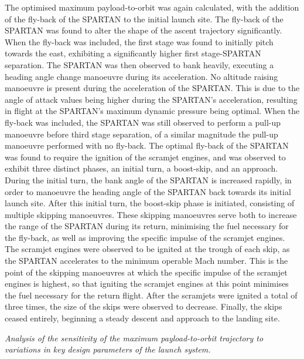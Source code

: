 The optimised maximum payload-to-orbit was again calculated, with the addition of the fly-back of the SPARTAN to the initial launch site. 
	The fly-back of the SPARTAN was found to alter the shape of the ascent trajectory significantly. When the fly-back was included, the first stage was found to initially pitch towards the east, exhibiting a significantly higher first stage-SPARTAN separation. The SPARTAN was then observed to bank heavily, executing a heading angle change manoeuvre during its acceleration. No altitude raising manoeuvre is present during the acceleration of the SPARTAN. This is due to the angle of attack values being higher during the SPARTAN's acceleration, resulting in flight at the SPARTAN's maximum dynamic pressure being optimal. 
When the fly-back was included, the SPARTAN was still observed to perform a pull-up manoeuvre before third stage separation, of a similar magnitude the pull-up manoeuvre performed with no fly-back. 
The optimal fly-back of the SPARTAN was found to require the ignition of the scramjet engines, and was observed to exhibit three distinct phases, an initial turn, a boost-skip, and an approach. 
During the initial turn, the bank angle of the SPARTAN is increased rapidly, in order to manoeuvre the heading angle of the SPARTAN back towards its initial launch site. 
After this initial turn, the boost-skip phase is initiated, consisting of multiple skipping manoeuvres. These skipping manoeuvres serve both to increase the range of the SPARTAN during its return, minimising the fuel necessary for the fly-back, as well as improving the specific impulse of the scramjet engines.
 The scramjet engines were observed to be ignited at the trough of each skip, as the SPARTAN accelerates to the minimum operable Mach number. This is the point of the skipping manoeuvres at which the specific impulse of the scramjet engines is highest, so that igniting the scramjet engines at this point minimises the fuel necessary for the return flight. 
 After the scramjets were ignited a total of three times, the size of the skips were observed to decrease. Finally, the skips ceased entirely, beginning a steady descent and approach to the landing site. 
 
	
	\emph{Analysis of the sensitivity of the maximum payload-to-orbit trajectory to variations in key design parameters of the launch system.}
	
